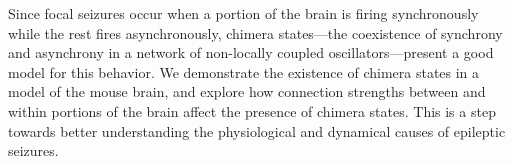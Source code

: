 Since focal seizures occur when a portion of the brain is firing synchronously while the rest fires asynchronously, chimera states---the coexistence of synchrony and asynchrony in a network of non-locally coupled oscillators---present a good model for this behavior.
We demonstrate the existence of chimera states in a model of the mouse brain, and explore how connection strengths between and within portions of the brain affect the presence of chimera states.
This is a step towards better understanding the physiological and dynamical causes of epileptic seizures.

